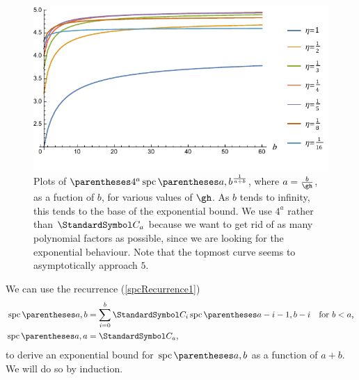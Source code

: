 \begin{figure}[htb!]
\centering
\includegraphics[scale=1]{spc-asymptotics}
\caption{Plots of $\pa{4^{a}\spc\of{a,b}}^{\frac{1}{a+b}}$,
where $a=\frac{b}{\gh}$,
as a fuction of $b$, for various values of $\gh$. As $b$ tends to infinity, this tends to the base
of the exponential bound.
We use $4^a$ rather than $\CatalanNumber a$ because we want to get rid of as many polynomial factors
as possible, since we are looking for the exponential behaviour.
Note that the topmost curve seems to asymptotically approach
$5$.\label{figSpcExperimental}}
\end{figure}

\label{appendixZetaBound}
We can use the recurrence (\ref{spcRecurrence1})
\begin{align*}\spc\of{a,b} &= \sum{i=0}[b]
\CatalanNumber {i}
\spc\of{a-i-1,b-i} &\text{for $b<a$,} \\
\spc\of{a,a} &= \CatalanNumber a \text,
\end{align*}
to derive an exponential bound for $\spc\of{a,b}$ as a function of $a+b$.
We will do so by induction.

